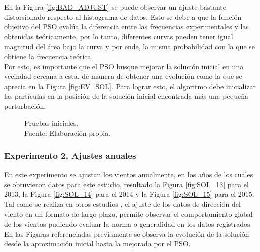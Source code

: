 En la Figura \ref{fig:BAD_ADJUST} se puede observar un ajuste bastante distorsionado respecto al histograma de datos. Esto se debe a que la función objetivo del PSO evalúa la diferencia entre las frecuencias experimentales y las obtenidas teóricamente, por lo tanto, diferentes curvas pueden tener igual magnitud del área bajo la curva y por ende, la misma probabilidad con la que se obtiene la frecuencia teórica.\\
Por esto, es importante que el PSO busque mejorar la solución inicial en una vecindad cercana a esta, de manera de obtener una evolución como la que se aprecia en la Figura \ref{fig:EV_SOL}. Para lograr esto, el algoritmo debe inicializar las partículas en la posición de la solución inicial encontrada más una pequeña perturbación.   
\begin{figure}[ht!]
     \centering
     \captionsetup{justification=centering,margin=2cm}
    \caption{Pruebas iniciales.\\ Fuente: Elaboración propia.}
    \label{fig:subfigures}
\end{figure}

\subsubsection{Experimento 2, Ajustes anuales}
En este experimento se ajustan los vientos anualmente, en los años de los cuales se obtuvieron datos para este estudio, resultado la Figura \ref{fig:SOL_13} para el 2013, la Figura \ref{fig:SOL_14} para el 2014 y la Figura \ref{fig:SOL_15} para el 2015.
Tal como se realiza en otros estudios \cite{Heckenbergerova15} \cite{Winddirelse15}, el ajuste de los datos de dirección del viento en un formato
de largo plazo, permite observar el comportamiento global de los vientos pudiendo evaluar la norma o generalidad en los datos registrados.
En las Figuras referenciadas previamente se observa la evolución de la solución desde la aproximación inicial hasta la mejorada por el PSO.

